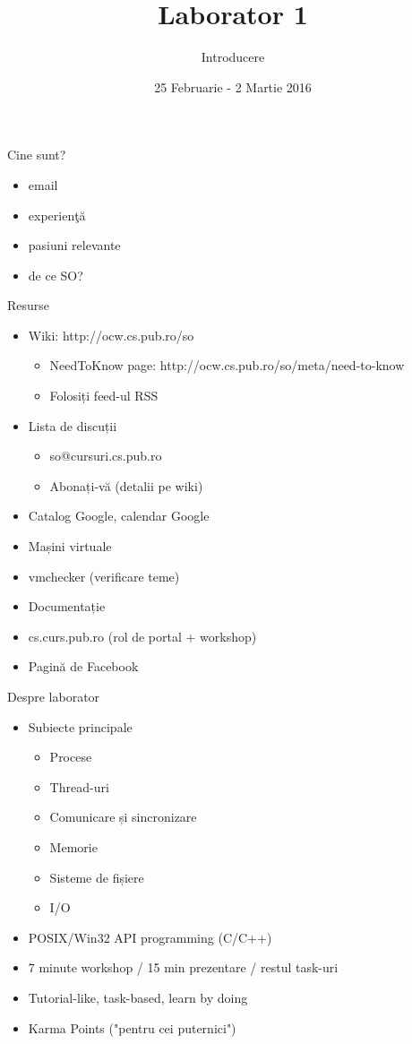 \documentclass{so.cs.pub.ro}
\title[Laborator 1]{Laborator 1}
\subtitle{Introducere}
\date{25 Februarie - 2 Martie 2016}
\begin{document}
\frame{\titlepage}

\begin{frame}{Cine sunt?}
  \begin{itemize}    %
    \item email
    \item experienţă
    \item pasiuni relevante
    \item de ce SO?
    \end{itemize}		
\end{frame}

\begin{frame}{Resurse}
	\begin{itemize}
		\item Wiki: http://ocw.cs.pub.ro/so
		\begin{itemize}
			\item NeedToKnow page: http://ocw.cs.pub.ro/so/meta/need-to-know
			\item Folosiți feed-ul RSS 
		\end{itemize}
		\item Lista de discuții
		\begin{itemize} 
			\item so@cursuri.cs.pub.ro
			\item Abonați-vă (detalii pe wiki)
		\end{itemize}
		\item Catalog Google, calendar Google
		\item Mașini virtuale
		\item vmchecker (verificare teme)
		\item Documentație
		\item cs.curs.pub.ro (rol de portal + workshop)
		\item Pagină de Facebook
	\end{itemize}
\end{frame}

\begin{frame}{Despre laborator}
  	\begin{itemize}   
    		\item Subiecte principale
		\begin{itemize}
			\item Procese
			\item Thread-uri
			\item Comunicare și sincronizare
			\item Memorie
			\item Sisteme de fișiere
			\item I/O
		\end{itemize}
		\vspace*{0.2cm}
		\item POSIX/Win32 API programming (C/C++)
		\item 7 minute workshop / 15 min prezentare / restul task-uri
		\item Tutorial-like, task-based, learn by doing
		\item Karma Points ("pentru cei puternici")
    	\end{itemize}		
\end{frame}
\end{document}
